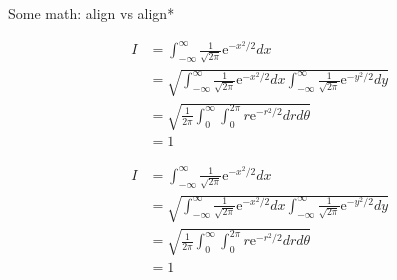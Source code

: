 \documentclass[aspectratio=169,mathserif,10pt]{beamer}
\newcommand{\newslide}[2]
{\begin{frame}{#1}
\begin{center}
{#2}
\end{center}
\end{frame}}
\begin{document}
\newslide{Some math: align vs align*}{

\vspace{-.5cm}

\begin{minipage}{0.48\textwidth}
    \begin{align}
    I &= \scriptstyle{\int_{-\infty}^{\infty}\frac{1}{\sqrt{2\pi}}\mbox{e}^{-x^2/2}dx}\\
      &= \scriptstyle{\sqrt{\int_{-\infty}^{\infty}\frac{1}{\sqrt{2\pi}}
    \mbox{e}^{-x^2/2}dx\int_{-\infty}^{\infty}
    \frac{1}{\sqrt{2\pi}}\mbox{e}^{-y^2/2}dy}}\nonumber\\
      &= \scriptstyle{\sqrt{\frac{1}{2\pi}\int_0^{\infty}
    \int_0^{2\pi}r\mbox{e}^{-r^2/2}drd\theta}}\\
      &= \scriptstyle{1}
    \end{align}
\end{minipage}

\begin{minipage}{0.48\textwidth}
    \begin{align*}
    I &= \scriptstyle{\int_{-\infty}^{\infty}\frac{1}{\sqrt{2\pi}}\mbox{e}^{-x^2/2}dx}\\
      &= \scriptstyle{\sqrt{\int_{-\infty}^{\infty} \frac{1}{\sqrt{2\pi}}
    \mbox{e}^{-x^2/2}dx\int_{-\infty}^{\infty}
    \frac{1}{\sqrt{2\pi}}\mbox{e}^{-y^2/2}dy}}\\
      &= \scriptstyle{\sqrt{\frac{1}{2\pi}\int_0^{\infty}
    \int_0^{2\pi}r\mbox{e}^{-r^2/2}drd\theta}}\\
      &= \scriptstyle{1}
    \end{align*}
\end{minipage}

}
\end{document}
